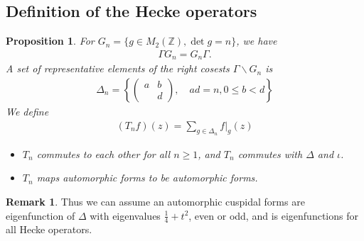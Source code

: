 \documentclass[11pt,reqno]{amsart}
\newcommand{\bna}{\begin{eqnarray*}}
\newcommand{\ena}{\end{eqnarray*}}
\newcommand{\bma}{\begin{pmatrix}}
\newcommand{\ema}{\end{pmatrix}}
\def\Z{\mathbb{Z}}
\newtheorem{prop}[lemma]{Proposition}
\theoremstyle{definition}
\newtheorem{remark}{Remark}
\newcommand{\bit}{\begin{itemize}}
\newcommand{\eit}{\end{itemize}}
\begin{document}
\subsection{Definition of the Hecke operators}
\begin{prop}
For $G_n=\{g\in M_2(\Z),\det g=n\}$, we have
\bna
\Gamma G_n=G_n\Gamma.
\ena
A set of representative elements of the right cosests $\Gamma\backslash G_n$ is
\bna
\Delta_n=\left\{\bma a&b\\&d\ema,\quad ad=n, 0\leq b<d\right\}
\ena
We define
\bna
(T_nf)(z)=\sum_{g\in \Delta_n} f|_{g}(z)
\ena
\bit
\item $T_n$ commutes to each other for all $n\geq 1$, and $T_n$ commutes with $\Delta$
and $\iota$.
\item $T_n$  maps automorphic forms to be automorphic forms.
\eit

\end{prop}
\begin{remark}
Thus we can assume an automorphic cuspidal forms are eigenfunction of $\Delta$
with eigenvalues $\frac{1}{4}+t^2$, even or odd, and is eigenfunctions for all Hecke operators.
\end{remark}
\end{document}
